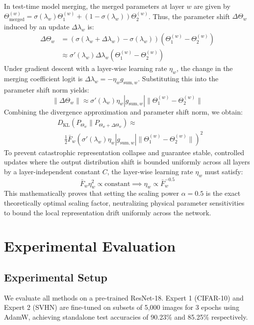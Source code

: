 \documentclass{article}
\theoremstyle{plain}
\theoremstyle{definition}
\theoremstyle{remark}
\begin{document}
In test-time model merging, the merged parameters at layer $w$ are given by $\Theta_{\text{merged}}^{(w)} = \sigma(\lambda_w) \Theta_1^{(w)} + (1 - \sigma(\lambda_w)) \Theta_2^{(w)}$. Thus, the parameter shift $\Delta \Theta_w$ induced by an update $\Delta \lambda_w$ is:
\begin{align}
    \Delta \Theta_w &= \left(\sigma(\lambda_w + \Delta \lambda_w) - \sigma(\lambda_w)\right) \left(\Theta_1^{(w)} - \Theta_2^{(w)}\right) \nonumber \\
    &\approx \sigma'(\lambda_w) \Delta \lambda_w \left(\Theta_1^{(w)} - \Theta_2^{(w)}\right)
\end{align}
Under gradient descent with a layer-wise learning rate $\eta_w$, the change in the merging coefficient logit is $\Delta \lambda_w = -\eta_w g_{\text{sum}, w}$. Substituting this into the parameter shift norm yields:
\begin{equation}
    \|\Delta \Theta_w\| \approx \sigma'(\lambda_w) \eta_w |g_{\text{sum}, w}| \|\Theta_1^{(w)} - \Theta_2^{(w)}\|
\end{equation}
Combining the divergence approximation and parameter shift norm, we obtain:
\begin{align}
    &D_{\text{KL}}(P_{\Theta_w} \parallel P_{\Theta_w + \Delta \Theta_w}) \approx \nonumber \\
    &\quad \frac{1}{2} \bar{F}_w \left( \sigma'(\lambda_w) \eta_w |g_{\text{sum}, w}| \|\Theta_1^{(w)} - \Theta_2^{(w)}\| \right)^2
\end{align}
To prevent catastrophic representation collapse and guarantee stable, controlled updates where the output distribution shift is bounded uniformly across all layers by a layer-independent constant $C$, the layer-wise learning rate $\eta_w$ must satisfy:
\begin{equation}
    \bar{F}_w \eta_w^2 \propto \text{constant} \implies \eta_w \propto \bar{F}_w^{-0.5}
\end{equation}
This mathematically proves that setting the scaling power $\alpha = 0.5$ is the exact theoretically optimal scaling factor, neutralizing physical parameter sensitivities to bound the local representation drift uniformly across the network.

\section{Experimental Evaluation}

\subsection{Experimental Setup}
We evaluate all methods on a pre-trained ResNet-18. Expert 1 (CIFAR-10) and Expert 2 (SVHN) are fine-tuned on subsets of 5,000 images for 3 epochs using AdamW, achieving standalone test accuracies of 90.23\% and 85.25\% respectively.
\end{document}
